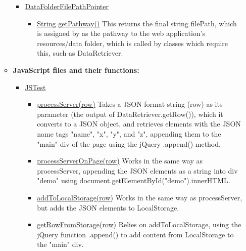 \begin{itemize}
\begin{itemize}
\begin{itemize}
\item \url{DataFolderFilePathPointer}

\begin{itemize}
\item \url{String} \url{getPathway()}\newline
This returns the final string filePath, which is assigned by as the pathway to the web application's resources/data folder, which is called by classes which require this, such as DataRetriever.
\end{itemize}

\end{itemize}

\item \textbf{JavaScript files and their functions:}

\begin{itemize}

\item \url{JSTest}

\begin{itemize}

\item \url{processServer(row)}\newline
Takes a JSON format string (row) as its parameter (the output of DataRetriever.getRow()), which it converts to a JSON object, and retrieves elements with the JSON name tags "name", "x", "y", and "z", appending them to the "main" div of the page using the jQuery .append() method.

\item \url{processServerOnPage(row)}\newline
Works in the same way as processServer, appending the JSON elements as a string into div "demo" using document.getElementById("demo").innerHTML.

\item \url{addToLocalStorage(row)}\newline
Works in the same way as processServer, but adds the JSON elements to LocalStorage.

\item \url{getRowFromStorage(row)}\newline
Relies on addToLocalStorage, using the jQuery function .append() to add content from LocalStorage to the "main" div.
\end{itemize}
\end{itemize}
\end{itemize}
\end{itemize}

